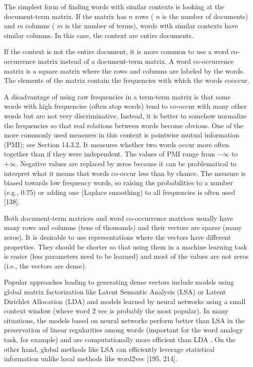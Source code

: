 \documentclass[10pt]{book}
\begin{document}
The simplest form of finding words with similar contexts is looking at the document-term matrix. If the matrix has $n$ rows ( $n$ is the number of documents) and $m$ columns ( $m$ is the number of terms), words with similar contexts have similar columns. In this case, the context are entire documents.

If the context is not the entire document, it is more common to use a word co-occurrence matrix instead of a document-term matrix. A word co-occurrence matrix is a square matrix where the rows and columns are labeled by the words. The elements of the matrix contain the frequencies with which the words cooccur.

A disadvantage of using raw frequencies in a term-term matrix is that some words with high frequencies (often stop words) tend to co-occur with many other words but are not very discriminative. Instead, it is better to somehow normalize the frequencies so that real relations between words become obvious. One of the more commonly used measures in this context is pointwise mutual information (PMI); see Section 14.3.2. It measures whether two words occur more often together than if they were independent. The values of PMI range from $-\infty$ to $+\infty$. Negative values are replaced by zeros because it can be problematical to interpret what it means that words co-occur less than by chance. The measure is biased towards low frequency words, so raising the probabilities to a number (e.g., 0.75) or adding one (Laplace smoothing) to all frequencies is often used [138].

Both document-term matrices and word co-occurrence matrices usually have many rows and columns (tens of thousands) and their vectors are sparse (many zeros). It is desirable to use representations where the vectors have different properties. They should be shorter so that using them in a machine learning task is easier (less parameters need to be learned) and most of the values are not zeros (i.e., the vectors are dense).

Popular approaches leading to generating dense vectors include models using global matrix factorization like Latent Semantic Analysis (LSA) or Latent Dirichlet Allocation (LDA) and models learned by neural networks using a small context window (where word 2 vec is probably the most popular). In many situations, the models based on neural networks perform better than LSA in the preservation of linear regularities among words (important for the word analogy task, for example) and are computationally more efficient than LDA . On the other hand, global methods like LSA can efficiently leverage statistical information unlike local methods like word2vec [195, 214].
\end{document}
